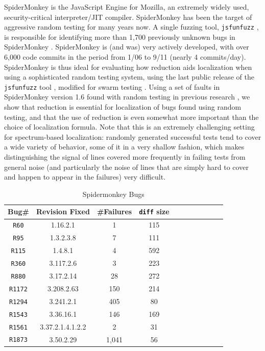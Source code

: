 SpiderMonkey is the JavaScript Engine for Mozilla, an extremely widely
used, security-critical interpreter/JIT compiler.  SpiderMonkey has
been the target of aggressive random testing for many years now.  A
single fuzzing tool, \texttt{jsfunfuzz} \cite{jsfunfuzz}, is
responsible for identifying more than 1,700 previously unknown bugs in
SpiderMonkey \cite{jsfunfuzzbugs}.  SpiderMonkey is (and was) very
actively developed, with over 6,000 code commits in the period from
1/06 to 9/11 (nearly 4 commits/day).  SpiderMonkey is thus ideal for
evaluating how reduction aids localization when using a sophisticated
random testing system, using the last public release of the
\texttt{jsfunfuzz} tool \cite{jsfunfuzz}, modified for swarm testing \cite{ISSTA12}.
Using a set of faults in SpiderMonkey version 1.6 found with random
testing in previous research \cite{PLDI13}, we show that reduction is
essential for localization of bugs found using random testing, and
that the use of reduction is even somewhat more important than the
choice of localization formula.  Note that this is an extremely
challenging setting for spectrum-based localization: randomly
generated successful tests tend to cover a wide variety of behavior,
some of it in a very shallow fashion, which makes distinguishing the
signal of lines covered more frequently in failing tests from general
noise (and particularly the noise of lines that are simply hard to
cover and happen to appear in the failures) very difficult.

\begin{table}
\begin{center}
\begin{tabular}{|c||c|c|c|c|c||c|c|c|c|c|}
\hline

\hline
Bug\# & Revision Fixed &  \#Failures & {\tt diff} size \\
\hline
\hline
{\tt R60} & 1.16.2.1 & 1 & 115  \\
\hline
{\tt R95} & 1.3.2.3.8 & 7 & 111   \\
\hline
{\tt R115} & 1.4.8.1 & 4 & 592   \\
\hline
{\tt R360} & 3.117.2.6 & 3 & 223  \\
\hline
{\tt R880} & 3.17.2.14 & 28 & 272   \\ 
\hline
{\tt R1172} & 3.208.2.63 & 150 & 214  \\
\hline
{\tt R1294} & 3.241.2.1 & 405 & 80  \\
\hline
{\tt R1543} & 3.36.16.1 & 146 & 169  \\
\hline
{\tt R1561} & 3.37.2.1.4.1.2.2 & 2 & 31  \\
\hline
{\tt R1873} & 3.50.2.29 & 1,041 & 56  \\
\hline
\hline
\end{tabular}
\end{center}
\caption{Spidermonkey Bugs}
\label{tab:spiderbugs}
\end{table}


